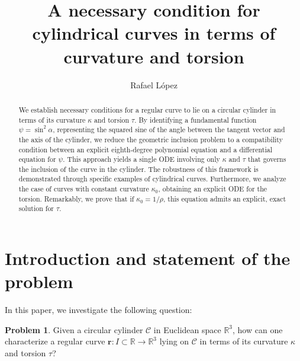 \documentclass[a4paper,12pt]{amsart}
\theoremstyle{plain}
\theoremstyle{definition}
\newtheorem*{problem}{Problem} %
\newcommand{\bfr}{\mathbf{r}}
\def\cy{\mathcal C}
\def\r{\mathbb R}
\begin{document}
\title[Cylindrical curves in terms of curvature and torsion]{A necessary condition for cylindrical curves in terms of curvature and torsion}
 


\author[R. L\'opez]{Rafael L\'opez}
\address{Rafael L\'opez \\ Department of Geometry and Topology\\ University of Granada. 18071 Granada.   Spain}

\begin{abstract}
 We establish necessary conditions for a regular curve to lie on a circular cylinder in terms of its curvature $\kappa$ and torsion $\tau$. By identifying a fundamental function $\psi = \sin^2 \alpha$, representing the squared sine of the angle between the tangent vector and the axis of the cylinder,  we reduce the geometric inclusion problem to a compatibility condition between  an explicit eighth-degree polynomial equation  and a   differential equation for $\psi$. This approach yields a single  ODE involving only $\kappa$ and $\tau$ that governs the inclusion of the curve in the cylinder.     The robustness of  this framework is   demonstrated through specific examples of cylindrical curves. Furthermore, we analyze the case of curves with constant curvature $\kappa_0$, obtaining an explicit ODE for  the torsion.   Remarkably, we prove that if $\kappa_0 = 1/\rho$, this equation admits   an explicit, exact solution for $\tau$.\end{abstract}
 

\maketitle

 
 
 
 
\section{Introduction and statement of the problem}\label{sec1}

In this paper, we investigate the following question:

\begin{problem}
Given a circular cylinder $\cy$ in Euclidean space $\r^3$, how can one characterize a regular curve $\bfr\colon I\subset\r\to\r^3$ lying on $\cy$  in terms of its curvature $\kappa$ and   torsion $\tau$? 
\end{problem}
 
\end{document}
